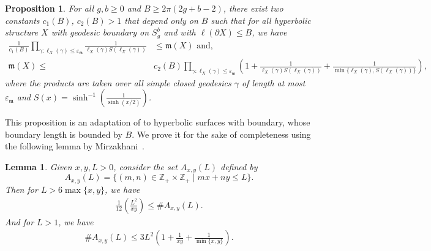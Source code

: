 \documentclass[a4paper,12pt]{article}
\newtheorem{proposition}[theorem]{Proposition}
\newtheorem{lemme}[theorem]{Lemma}
\theoremstyle{definition}
\theoremstyle{remark}
\begin{document}
\begin{proposition}\label{prop:controleMesureThurston}
    For all $g,b \geqslant 0$ and $B \geqslant 2\pi(2g+b-2)$, there exist two constants $c_1(B)$, $c_2(B)>1$ that depend only on $B$ such that for all hyperbolic structure $X$ with geodesic boundary on $S_g^b$ and with $\ell(\partial X) \leqslant B$, we have
    \begin{align*}
        \frac{1}{c_1(B)} \prod_{\gamma : \ell_X(\gamma)\leqslant \varepsilon_{\mathfrak{m}}} \frac{1}{\ell_X(\gamma)S(\ell_X(\gamma))} & \leqslant \mathfrak{m}(X) \mbox{ and,}\\
        \mathfrak{m}(X) \leqslant & c_2(B) \prod_{\gamma : \ell_X(\gamma)\leqslant \varepsilon_{\mathfrak{m}}} \left( 1 + \frac{1}{\ell_X(\gamma)S(\ell_X(\gamma))} + \frac{1}{\min\{\ell_X(\gamma),S(\ell_X(\gamma))\}} \right),
    \end{align*}
    where the products are taken over all simple closed geodesics $\gamma$ of length at most $\varepsilon_{\mathfrak{m}}$ and $S(x)=\sinh^{-1}\left( \frac{1}{\sinh(x/2)} \right)$.
\end{proposition}

This proposition is an adaptation of \cite[Proposition~3.6]{mirzakhani} to hyperbolic surfaces with boundary, whose boundary length is bounded by $B$. We prove it for the sake of completeness using the following lemma by Mirzakhani~\cite{mirzakhani}. 

\begin{lemme}
    Given $x,y,L>0$, consider the set $A_{x,y}(L)$ defined by
    \[
        A_{x,y}(L)=\{ (m,n) \in \mathbb{Z}_+ \times \mathbb{Z}_+ \mid mx + ny \leqslant L \}.
    \]
    Then for $L>6\max\{x,y\}$, we have
    \begin{align}
        \frac{1}{12}\left( \frac{L^2}{xy} \right) \leqslant \# A_{x,y}(L). \label{rel:AxyMin}
    \end{align}
    And for $L>1$, we have
    \begin{align}
         \# A_{x,y}(L) \leqslant 3L^2\left( 1 + \frac{1}{xy} +\frac{1}{\min\{x,y\}} \right). \label{rel:AxyMaj}
    \end{align}
\end{lemme}
\end{document}
